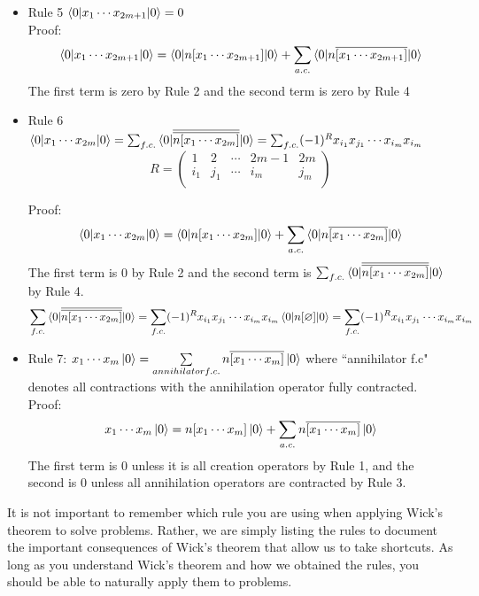\documentclass{article}
\newcommand{\ol}{\overline}
\newcommand{\cd}{\ensuremath{\cdots} }
\begin{document}
\begin{itemize}
\item Rule 5 $\braket{0 | x_1 \cd x_{2m + 1} | 0} = 0 $ \\

Proof: 
\[\braket{0 | x_1 \cd x_{2m + 1} | 0}   =  \braket{0 | n[x_1 \cd x_{2m + 1}] | 0}  +  \sum_{a.c.} \braket{0 | n\ol{[x_1 \cd x_{2m + 1}]} | 0}  \]
The first term is zero by Rule 2 and the second term is zero by Rule 4

 \item Rule 6 $\braket{0 | x_1 \cd x_{2m } | 0} = \sum_{f.c.} \braket{0 | \ol{\ol{ n[x_1 \cd x_{2m }]}}|0} = \sum_{f.c.} (-1)^R x_{i_1} x_{j_1} \cd x_{i_m} x_{i_m}$\\

\begin{equation*}
R = 
\begin{pmatrix}
1 & 2 &\cd  & 2m - 1 & 2m  \\
i_1 & j_1 & \cd  & i_m & j_m \\
\end{pmatrix}
\end{equation*}

Proof: 
\[\braket{0 | x_1 \cd x_{2m} | 0}   =  \braket{0 | n[x_1 \cd x_{2m}] | 0}  +  \sum_{a.c.} \braket{0 | n\ol{[x_1 \cd x_{2m}]} | 0}  \]
The first term is 0 by Rule 2 and the second term is $ \sum_{f.c.} \braket{0 | \ol{\ol{ n[x_1 \cd x_{2m }]}}|0}$ by Rule 4. 
\[ \sum_{f.c.} \braket{0 | \ol{\ol{ n[x_1 \cd x_{2m }]}}|0} =  \sum_{f.c.} (-1)^R x_{i_1} x_{j_1} \cd x_{i_m} x_{i_m} \braket{0 | n[\varnothing] | 0} = \sum_{f.c.} (-1)^R x_{i_1} x_{j_1} \cd x_{i_m} x_{i_m}  \]

\item Rule 7: $x_1 \cd x_m \ket{0} = \sum\limits_{annihilator f.c.} n\ol{[x_1 \cd x_m] }\ket{0} $
where ``annihilator f.c" denotes all contractions with the annihilation operator fully contracted.\\

Proof: 
\[x_1 \cd x_m \ket{0} = n[x_1 \cd x_m] \ket{0} + \sum_{a.c.} n\ol{[x_1 \cd x_m ]} \ket{0} \]
The first term is 0 unless it is all creation operators by Rule 1, and the second is 0 unless all annihilation operators are contracted by Rule 3. 
\end{itemize}
It is not important to remember which rule you are using when applying Wick's theorem to solve problems. 
Rather, we are simply listing the rules to document the important consequences of Wick's theorem that allow us to take shortcuts.
As long as you understand Wick's theorem and how we obtained the rules, you should be able to naturally apply them to problems. 
\end{document}
